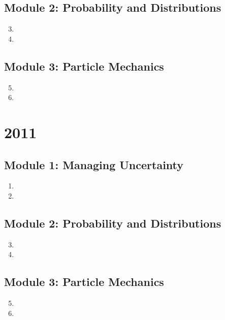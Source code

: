 \documentclass[fleqn,titlepage]{book}
\numberwithin{equation}{section}
\theoremstyle{plain}
\theoremstyle{definition}
\theoremstyle{remark}
\begin{document}
\section{Module 2: Probability and Distributions}
\begin{enumerate}[label=\bfseries  \arabic*.]\setcounter{enumi}{2}
\item 
\item 
\end{enumerate}
\section{Module 3: Particle Mechanics}
\begin{enumerate}[label=\bfseries  \arabic*.]\setcounter{enumi}{4}
\item 
\item 
\end{enumerate}

\chapter{2011}
\section{Module 1: Managing Uncertainty}
\begin{enumerate}[label=\bfseries  \arabic*.]\setcounter{enumi}{0}
\item 
\item 
\end{enumerate}
\section{Module 2: Probability and Distributions}
\begin{enumerate}[label=\bfseries  \arabic*.]\setcounter{enumi}{2}
\item 
\item 
\end{enumerate}
\section{Module 3: Particle Mechanics}
\begin{enumerate}[label=\bfseries  \arabic*.]\setcounter{enumi}{4}
\item 
\item 
\end{enumerate}
\end{document}
